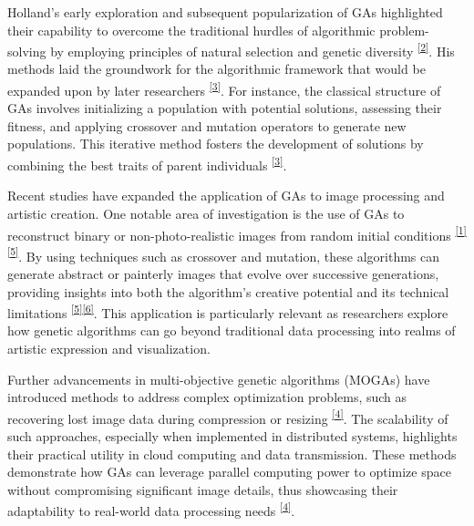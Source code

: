 \documentclass[10pt, conference]{IEEEtran}
\begin{document}
Holland's early exploration and subsequent popularization of GAs highlighted their capability to overcome the traditional hurdles of algorithmic problem-solving by employing principles of natural selection and genetic diversity \hypertarget{ref}{\textsuperscript{\hyperref[sec:2r]{[2]}\label{sec:2}}}. His methods laid the groundwork for the algorithmic framework that would be expanded upon by later researchers \hypertarget{ref}{\textsuperscript{\hyperref[sec:3r]{[3]}\label{sec:3}}}. For instance, the classical structure of GAs involves initializing a population with potential solutions, assessing their fitness, and applying crossover and mutation operators to generate new populations. This iterative method fosters the development of solutions by combining the best traits of parent individuals \hypertarget{ref}{\textsuperscript{\hyperref[sec:3r]{[3]}\label{sec:3}}}.

Recent studies have expanded the application of GAs to image processing and artistic creation. One notable area of investigation is the use of GAs to reconstruct binary or non-photo-realistic images from random initial conditions \hypertarget{ref}{\textsuperscript{\hyperref[sec:1r]{[1]}\label{sec:1}}}\hypertarget{ref}{\textsuperscript{\hyperref[sec:5r]{[5]}\label{sec:5}}}. By using techniques such as crossover and mutation, these algorithms can generate abstract or painterly images that evolve over successive generations, providing insights into both the algorithm's creative potential and its technical limitations \hypertarget{ref}{\textsuperscript{\hyperref[sec:5r]{[5]}\label{sec:5}}}\hypertarget{ref}{\textsuperscript{\hyperref[sec:6r]{[6]}\label{sec:6}}}. This application is particularly relevant as researchers explore how genetic algorithms can go beyond traditional data processing into realms of artistic expression and visualization.

Further advancements in multi-objective genetic algorithms (MOGAs) have introduced methods to address complex optimization problems, such as recovering lost image data during compression or resizing \hypertarget{ref}{\textsuperscript{\hyperref[sec:4r]{[4]}\label{sec:4}}}. The scalability of such approaches, especially when implemented in distributed systems, highlights their practical utility in cloud computing and data transmission. These methods demonstrate how GAs can leverage parallel computing power to optimize space without compromising significant image details, thus showcasing their adaptability to real-world data processing needs \hypertarget{ref}{\textsuperscript{\hyperref[sec:4r]{[4]}\label{sec:4}}}.
\end{document}
